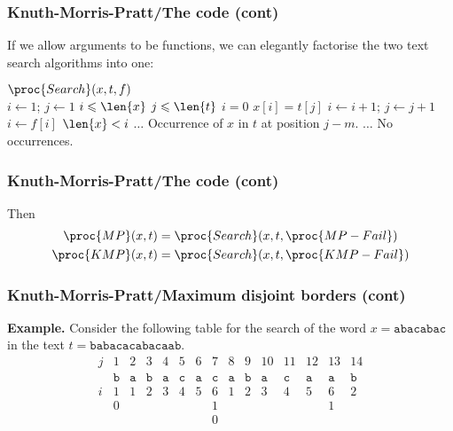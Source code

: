 %
\begin{frame}
\frametitle{Knuth-Morris-Pratt/The code (cont)}

If we allow arguments to be functions, we can elegantly factorise the
two text search algorithms into one:
\begin{codebox}
\(\proc{Search} (x,t,f)\)\\
\li \(i \gets 1\); \(j \gets 1\)
\li \While \(i \leqslant \len{x}\) \LogAnd \(j \leqslant \len{t}\)
\li \Do \If \(i = 0\) \LogOr \(x[i] = t[j]\)
\li	\Then \(i \gets i + 1\); \(j \gets j + 1\)
\li	\Else \(i \gets f[i]\)
        \End
    \End
\li \If \(\len{x} < i\) 
\li \Then \(\ldots\) \RComment Occurrence of \(x\) in \(t\) at position \(j - m\).
\li \Else \(\ldots\) \RComment No occurrences. 
    \End
\end{codebox}

\end{frame}

%
\begin{frame}
\frametitle{Knuth-Morris-Pratt/The code (cont)}

Then 
\begin{align*}
   \proc{MP} (x, t) 
&= \proc{Search} (x, t, \proc{MP-Fail})\\
   \proc{KMP} (x, t)
&= \proc{Search} (x, t, \proc{KMP-Fail})
\end{align*}

\end{frame}

%
\begin{frame}
\frametitle{Knuth-Morris-Pratt/Maximum disjoint borders (cont)}

\textbf{Example.} Consider the following table for the search of the
word \(x=\texttt{abacabac}\) in the text
\(t=\texttt{babacacabacaab}\).
\[
\begin{array}{c|cccccccccccccc|}
j & 1 & 2 & 3 & 4 & 5 & 6 & 7 & 8 & 9 & 10 & 11 & 12 & 13 & 14\\
  & \texttt{b} & \texttt{a} & \texttt{b} & \texttt{a} & \texttt{c} 
  & \texttt{a} & \texttt{c} & \texttt{a} & \texttt{b} & \texttt{a} 
  & \texttt{c} & \texttt{a} & \texttt{a} & \texttt{b}\\
\hline
i & 1 & 1 & 2 & 3 & 4 & 5 & 6 & 1 & 2 & 3 & 4 & 5 & 6 & 2 \\
  & 0 &   &   &   &   &   & 1 &   &   &   &   &   & 1 &   \\
  &   &   &   &   &   &   & 0 &   &   &   &   &   &   &
\end{array}
\]

\end{frame}

